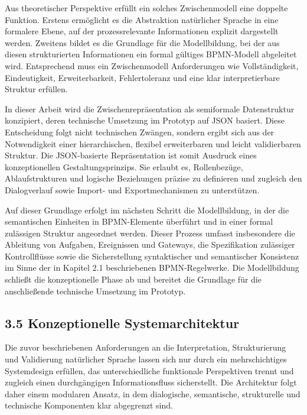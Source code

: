 \documentclass[a4paper,12pt]{scrreprt}
\begin{document}
Aus theoretischer Perspektive erfüllt ein solches Zwischenmodell eine doppelte Funktion. Erstens ermöglicht es die Abstraktion natürlicher Sprache in eine formalere Ebene, auf der prozessrelevante Informationen explizit dargestellt werden. Zweitens bildet es die Grundlage für die Modellbildung, bei der aus diesen strukturierten Informationen ein formal gültiges BPMN-Modell abgeleitet wird. Entsprechend muss ein Zwischenmodell Anforderungen wie Vollständigkeit, Eindeutigkeit, Erweiterbarkeit, Fehlertoleranz und eine klar interpretierbare Struktur erfüllen.

In dieser Arbeit wird die Zwischenrepräsentation als semiformale Datenstruktur konzipiert, deren technische Umsetzung im Prototyp auf JSON basiert. Diese Entscheidung folgt nicht technischen Zwängen, sondern ergibt sich aus der Notwendigkeit einer hierarchischen, flexibel erweiterbaren und leicht validierbaren Struktur. Die JSON-basierte Repräsentation ist somit Ausdruck eines konzeptionellen Gestaltungsprinzips. Sie erlaubt es, Rollenbezüge, Ablaufstrukturen und logische Beziehungen präzise zu definieren und zugleich den Dialogverlauf sowie Import- und Exportmechanismen zu unterstützen.

Auf dieser Grundlage erfolgt im nächsten Schritt die Modellbildung, in der die semantischen Einheiten in BPMN-Elemente überführt und in einer formal zulässigen Struktur angeordnet werden. Dieser Prozess umfasst insbesondere die Ableitung von Aufgaben, Ereignissen und Gateways, die Spezifikation zulässiger Kontrollflüsse sowie die Sicherstellung syntaktischer und semantischer Konsistenz im Sinne der in Kapitel 2.1 beschriebenen BPMN-Regelwerke. Die Modellbildung schließt die konzeptionelle Phase ab und bereitet die Grundlage für die anschließende technische Umsetzung im Prototyp.

\subsection*{3.5 Konzeptionelle Systemarchitektur}

Die zuvor beschriebenen Anforderungen an die Interpretation, Strukturierung und Validierung natürlicher Sprache lassen sich nur durch ein mehrschichtiges Systemdesign erfüllen, das unterschiedliche funktionale Perspektiven trennt und zugleich einen durchgängigen Informationsfluss sicherstellt. Die Architektur folgt daher einem modularen Ansatz, in dem dialogische, semantische, strukturelle und technische Komponenten klar abgegrenzt sind.
\end{document}
